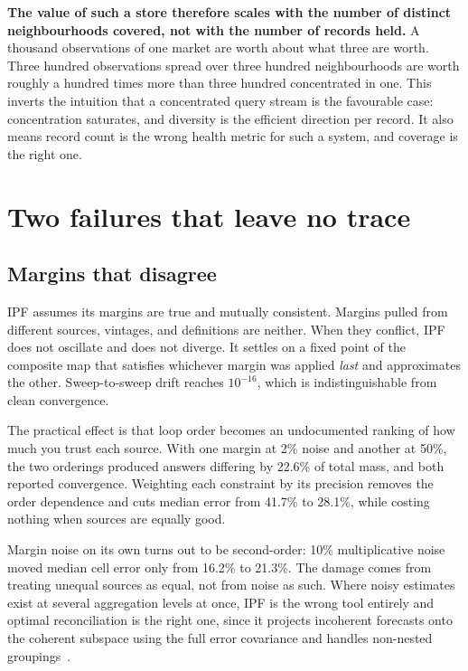 \documentclass[11pt]{article}
\begin{document}
\textbf{The value of such a store therefore scales with the number of distinct
neighbourhoods covered, not with the number of records held.} A thousand
observations of one market are worth about what three are worth. Three hundred
observations spread over three hundred neighbourhoods are worth roughly a
hundred times more than three hundred concentrated in one. This inverts the
intuition that a concentrated query stream is the favourable case: concentration
saturates, and diversity is the efficient direction per record. It also means
record count is the wrong health metric for such a system, and coverage is the
right one.

\section{Two failures that leave no trace}

\subsection{Margins that disagree}

IPF assumes its margins are true and mutually consistent. Margins pulled from
different sources, vintages, and definitions are neither. When they conflict, IPF
does not oscillate and does not diverge. It settles on a fixed point of the
composite map that satisfies whichever margin was applied \emph{last} and
approximates the other. Sweep-to-sweep drift reaches $10^{-16}$, which is
indistinguishable from clean convergence.

The practical effect is that loop order becomes an undocumented ranking of how
much you trust each source. With one margin at 2\% noise and another at 50\%, the
two orderings produced answers differing by 22.6\% of total mass, and both
reported convergence. Weighting each constraint by its precision removes the
order dependence and cuts median error from 41.7\% to 28.1\%, while costing
nothing when sources are equally good.

Margin noise on its own turns out to be second-order: 10\% multiplicative noise
moved median cell error only from 16.2\% to 21.3\%. The damage comes from
treating unequal sources as equal, not from noise as such. Where noisy estimates
exist at several aggregation levels at once, IPF is the wrong tool entirely and
optimal reconciliation is the right one, since it projects incoherent forecasts
onto the coherent subspace using the full error covariance and handles non-nested
groupings~\cite{mint}.
\end{document}
